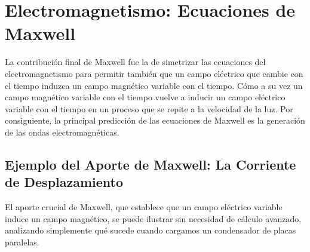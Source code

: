 \documentclass[11pt,a4paper]{book}
\begin{document}
\section{Electromagnetismo: Ecuaciones de Maxwell}
La contribución final de Maxwell fue la de simetrizar las ecuaciones del electromagnetismo para permitir también que un campo eléctrico que cambie con el tiempo induzca un campo magnético variable con el tiempo. Cómo a su vez un campo magnético variable con el tiempo vuelve a inducir un campo eléctrico variable con el tiempo en un proceso que se repite a la velocidad de la luz. Por consiguiente, la principal predicción de las ecuaciones de Maxwell es la  generación de las ondas electromagnéticas.


\subsection{Ejemplo del Aporte de Maxwell: La Corriente de Desplazamiento}



El aporte crucial de Maxwell, que establece que un campo eléctrico variable induce un campo magnético, se puede ilustrar sin necesidad de cálculo avanzado, analizando simplemente qué sucede cuando cargamos un condensador de placas paralelas.
\end{document}
